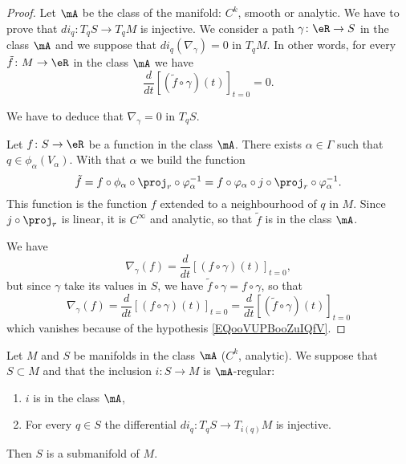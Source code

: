 \begin{proof}
	Let \( \mA\) be the class of the manifold: \( C^k\), smooth or analytic. We have to prove that \(di_q \colon T_qS\to T_qM  \) is injective. We consider a path \(\gamma \colon \eR\to S  \) in the class \( \mA\) and we suppose that \( di_q(\nabla_{\gamma})=0\) in \( T_qM\). In other words, for every \(\tilde f \colon M\to \eR  \) in the class \( \mA\) we have
	\begin{equation}	\label{EQooVUPBooZuIQfV}
		\frac{d}{dt} \left[ (\tilde f\circ \gamma)(t)  \right]_{t=0}=0.
	\end{equation}

	We have to deduce that \( \nabla_{\gamma}=0\) in \( T_qS\).

	Let \(f \colon S\to \eR  \) be a function in the class \( \mA\). There exists \( \alpha\in \Gamma\) such that \( q\in \phi_{\alpha}(V_{\alpha})\). With that \( \alpha\) we build the function
	\begin{equation}
		\tilde f=f\circ\phi_{\alpha}\circ\proj_r\circ\varphi_{\alpha}^{-1}=f\circ\varphi_{\alpha}\circ j\circ \proj_r\circ\varphi_{\alpha}^{-1}.
	\end{equation}
	This function is the function \( f\) extended to a neighbourhood of \( q\) in \( M\). Since \( j\circ\proj_r\) is linear, it is \( C^{\infty}\) and analytic, so that \( \tilde  f\) is in the class \( \mA\).

	We have
	\begin{equation}
		\nabla_{\gamma}(f)=\frac{d}{dt} \left[ (f\circ \gamma)(t)  \right]_{t=0},
	\end{equation}
	but since \( \gamma\) take its values in \( S\), we have \( \tilde f\circ\gamma=f\circ\gamma\), so that
	\begin{equation}
		\nabla_{\gamma}(f)=\frac{d}{dt} \left[ (f\circ \gamma)(t)  \right]_{t=0}=\frac{d}{dt} \left[ (\tilde f\circ\gamma)(t)  \right]_{t=0}
	\end{equation}
	which vanishes because of the hypothesis \ref{EQooVUPBooZuIQfV}.
\end{proof}

\begin{proposition}     \label{PROPooZACHooCNgLSl}
	Let \( M\) and \( S\) be manifolds in the class \( \mA\) (\( C^k\), analytic). We suppose that \( S\subset M\) and that the inclusion \(i \colon S\to M  \) is \( \mA\)-regular:
	\begin{enumerate}
		\item
		      \( i\) is in the class \( \mA\),
		\item
		      For every \( q\in S\) the differential \(di_q \colon T_qS\to T_{i(q)}M  \) is injective.
	\end{enumerate}
	Then \( S\) is a submanifold of \( M\).
\end{proposition}

